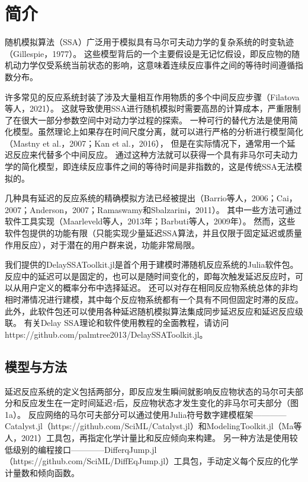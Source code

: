 
\chapter{简介}


随机模拟算法（SSA）广泛用于模拟具有马尔可夫动力学的复杂系统的时变轨迹（Gillespie，1977）。
这些模型背后的一个主要假设是无记忆假设，即反应物的随机动力学仅受系统当前状态的影响，这意味着连续反应事件之间的等待时间遵循指数分布。


许多常见的反应系统封装了涉及大量相互作用物质的多个中间反应步骤（Filatova等人，2021）。
这就导致使用SSA进行随机模拟时需要高昂的计算成本，严重限制了在很大一部分参数空间中对动力学过程的探索。
一种可行的替代方法是使用简化模型。虽然理论上如果存在时间尺度分离，就可以进行严格的分析进行模型简化（Mastny et al.，2007；Kan et al.，2016），
但是在实际情况下，通常用一个延迟反应来代替多个中间反应。
通过这种方法就可以获得一个具有非马尔可夫动力学的简化模型，即连续反应事件之间的等待时间是非指数的，这是传统SSA无法模拟的。


几种具有延迟的反应系统的精确模拟方法已经被提出（Barrio等人，2006；Cai，2007；Anderson，2007；Ramaswamy和Sbalzarini，2011）。
其中一些方法可通过软件工具实现（Maarleveld等人，2013年；Barbuti等人，2009年）。
然而，这些软件包提供的功能有限（只能实现少量延迟SSA算法，并且仅限于固定延迟或质量作用反应），对于潜在的用户群来说，功能非常局限。


我们提供的DelaySSAToolkit.jl是首个用于建模时滞随机反应系统的Julia软件包。
反应中的延迟可以是固定的，也可以是随时间变化的，即每次触发延迟反应时，可以从用户定义的概率分布中选择延迟。
还可以对存在相同反应物系统总体的非均相时滞情况进行建模，其中每个反应物系统都有一个具有不同但固定时滞的反应。
此外，此软件包还可以使用各种延迟随机模拟算法集成同步延迟反应和延迟反应级联。
有关Delay SSA理论和软件使用教程的全面教程，请访问https://github.com/palmtree2013/DelaySSAToolkit.jl。 


\section{模型与方法}

延迟反应系统的定义包括两部分，即反应发生瞬间就影响反应物状态的马尔可夫部分和反应发生在一定时间延迟$\tau$后，反应物状态才发生变化的非马尔可夫部分（图1a）。
反应网络的马尔可夫部分可以通过使用Julia符号数字建模框架————Catalyst.jl（https://github.com/SciML/Catalyst.jl）和ModelingToolkit.jl（Ma等人，2021）工具包，再指定化学计量比和反应倾向来构建。
另一种方法是使用较低级别的编程接口————DifferqJump.jl（https://github.com/SciML/DiffEqJump.jl）工具包，手动定义每个反应的化学计量数和倾向函数。 

